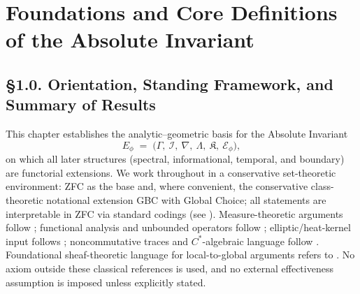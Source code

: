 \chapter{Foundations and Core Definitions of the Absolute Invariant}
\label{ch:foundations}

\section{§1.0. Orientation, Standing Framework, and Summary of Results}
\label{sec:1.0-orientation}

\noindent
This chapter establishes the analytic–geometric basis for the Absolute Invariant
\[
E_\phi \;=\; \big(\Gamma,\ \mathcal I,\ \nabla,\ \Lambda,\ \mathfrak K,\ \mathcal E_\phi\big),
\]
on which all later structures (spectral, informational, temporal, and boundary) are functorial extensions. 
We work throughout in a conservative set-theoretic environment: ZFC as the base and, where convenient, the conservative class-theoretic notational extension GBC with Global Choice; all statements are interpretable in ZFC via standard codings (see \cite{Jech, Kunen}). 
Measure-theoretic arguments follow \cite{Halmos, Bogachev1,Bogachev2}; functional analysis and unbounded operators follow \cite{ReedSimon1,ReedSimon2}; elliptic/heat-kernel input follows \cite{Grigoryan, Davies, Hormander1}; noncommutative traces and $C^*$-algebraic language follow \cite{TakesakiI, TakesakiII, Blackadar, Connes}. 
Foundational sheaf-theoretic language for local-to-global arguments refers to \cite{Bredon, BottTu, KashiwaraSchapira}. 
No axiom outside these classical references is used, and no external effectiveness assumption is imposed unless explicitly stated.

